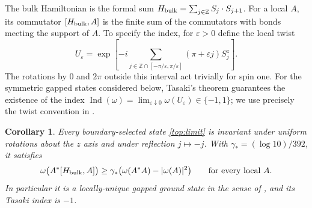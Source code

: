 \documentclass[11pt]{article}
\newtheorem{corollary}[theorem]{Corollary}
\theoremstyle{remark}
\numberwithin{equation}{section}
\begin{document}
The bulk Hamiltonian is the formal sum
$H_{\rm bulk}=\sum_{j\in\mathbb Z}S_j\cdot S_{j+1}$.
For a local $A$, its commutator $[H_{\rm bulk},A]$ is the finite sum
of the commutators with bonds meeting the support of $A$.
To specify the index, for $\varepsilon>0$ define the local twist
\begin{equation}\label{top:twist}
 U_\varepsilon=
 \exp\left[-i\sum_{j\in\mathbb Z\cap[-\pi/\varepsilon,\pi/\varepsilon]}
                 (\pi+\varepsilon j)S_j^z\right].
\end{equation}
The rotations by $0$ and $2\pi$ outside this interval act trivially
for spin one. For the symmetric gapped states considered below,
Tasaki's theorem guarantees the existence of the index
$\operatorname{Ind}(\omega)=\lim_{\varepsilon\downarrow0}
\omega(U_\varepsilon)\in\{-1,1\}$; we use precisely the twist convention in
\cite[Equations (10)--(13)]{Tasaki2025}.

\begin{corollary}\label{cor:topology}
Every boundary-selected state \eqref{top:limit} is invariant under
uniform rotations about the $z$ axis and under reflection $j\mapsto-j$.
With $\gamma_*=(\log10)/392$, it satisfies
\begin{equation}\label{top:local-gap}
 \omega\bigl(A^*[H_{\rm bulk},A]\bigr)
 \ge\gamma_*\bigl(\omega(A^*A)-|\omega(A)|^2\bigr)
 \qquad\text{for every local }A.
\end{equation}
In particular it is a locally-unique gapped ground state in the sense
of \cite[Definition 11]{Tasaki2025}, and its Tasaki index is $-1$.
\end{corollary}
\end{document}
